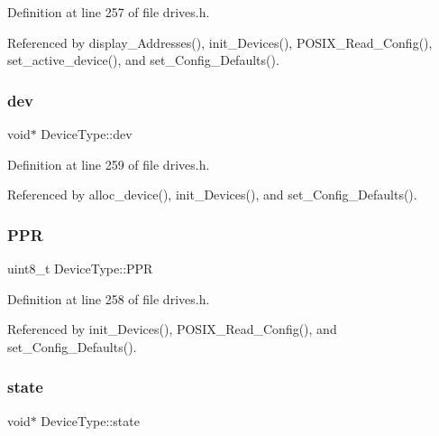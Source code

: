 Definition at line 257 of file drives.\+h.



Referenced by display\+\_\+\+Addresses(), init\+\_\+\+Devices(), P\+O\+S\+I\+X\+\_\+\+Read\+\_\+\+Config(), set\+\_\+active\+\_\+device(), and set\+\_\+\+Config\+\_\+\+Defaults().

\mbox{\label{structDeviceType_a59fc3b3cb45f8ee0cd1016bd64804d3b}} 
\subsubsection{\texorpdfstring{dev}{dev}}
{\footnotesize\ttfamily void$\ast$ Device\+Type\+::dev}



Definition at line 259 of file drives.\+h.



Referenced by alloc\+\_\+device(), init\+\_\+\+Devices(), and set\+\_\+\+Config\+\_\+\+Defaults().

\mbox{\label{structDeviceType_ae0e59c6c17582ff80bdab3f2010e8d57}} 
\subsubsection{\texorpdfstring{P\+PR}{PPR}}
{\footnotesize\ttfamily uint8\+\_\+t Device\+Type\+::\+P\+PR}



Definition at line 258 of file drives.\+h.



Referenced by init\+\_\+\+Devices(), P\+O\+S\+I\+X\+\_\+\+Read\+\_\+\+Config(), and set\+\_\+\+Config\+\_\+\+Defaults().

\mbox{\label{structDeviceType_ad0fc43d63606bab6c259047e36512e08}} 
\subsubsection{\texorpdfstring{state}{state}}
{\footnotesize\ttfamily void$\ast$ Device\+Type\+::state}



